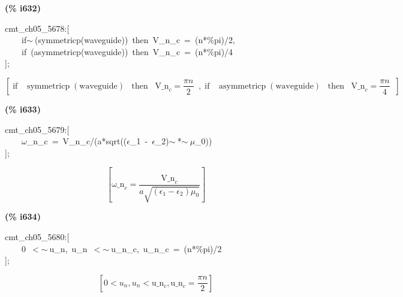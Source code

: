 \documentclass[fleqn]{article}
\begin{document}
\noindent
\begin{minipage}[t]{4.000000em}\color{red}\bfseries
(\% i632)	
\end{minipage}
\begin{minipage}[t]{\textwidth}\color{blue}
cmt\_ch05\_5678:[\\
\ \ \ \ if\ensuremath{\sim\ }(symmetricp(waveguide))\ then\ V\_n\_c\ =\ (n*\%pi)/2,\\
\ \ \ \ if\ (asymmetricp(waveguide))\ then\ V\_n\_c\ =\ (n*\%pi)/4\\
];
\end{minipage}
\[\displaystyle \tag{\% o632} 
\operatorname{[}\operatorname{if}\operatorname{ }\operatorname{symmetricp}\left( \ensuremath{\mathrm{waveguide}}\right) \operatorname{ }\operatorname{then}\operatorname{ }{{\ensuremath{\mathrm{V\_ n}}}_c}=\frac{\ensuremath{\pi}  n}{2}\operatorname{ }\operatorname{,}\operatorname{if}\operatorname{ }\operatorname{asymmetricp}\left( \ensuremath{\mathrm{waveguide}}\right) \operatorname{ }\operatorname{then}\operatorname{ 
}{{\ensuremath{\mathrm{V\_ n}}}_c}=\frac{\ensuremath{\pi}  n}{4}\operatorname{ }\operatorname{]}\mbox{}
\]


\noindent
\begin{minipage}[t]{4.000000em}\color{red}\bfseries
(\% i633)	
\end{minipage}
\begin{minipage}[t]{\textwidth}\color{blue}
cmt\_ch05\_5679:[\\
\ \ \ \ \ensuremath{\omega}\_n\_c\ =\ V\_n\_c/(a*sqrt((\ensuremath{\epsilon}\_1\ -\ \ensuremath{\epsilon}\_2)\ensuremath{\sim\ }*\ensuremath{\sim\ }\ensuremath{\mu}\_0))\ \\
];
\end{minipage}
\[\displaystyle \tag{\% o633} 
\left[ {{\ensuremath{\mathrm{\omega \_ n}}}_c}=\frac{{{\ensuremath{\mathrm{V\_ n}}}_c}}{a \sqrt{\left( {{\epsilon }_1}-{{\epsilon }_2}\right)  {{\mu }_0}}}\right] \mbox{}
\]


\noindent
\begin{minipage}[t]{4.000000em}\color{red}\bfseries
(\% i634)	
\end{minipage}
\begin{minipage}[t]{\textwidth}\color{blue}
cmt\_ch05\_5680:[\\
\ \ \ \ 0\ \ensuremath{<}\ensuremath{\sim\ }u\_n,\ u\_n\ \ensuremath{<}\ensuremath{\sim\ }u\_n\_c,\ u\_n\_c\ =\ (n*\%pi)/2\\
];
\end{minipage}
\[\displaystyle \tag{\% o634} 
\left[ 0\operatorname{<  }{u_n}\operatorname{,}{u_n}\operatorname{<  }{{\ensuremath{\mathrm{u\_ n}}}_c}\operatorname{,}{{\ensuremath{\mathrm{u\_ n}}}_c}=\frac{\ensuremath{\pi}  n}{2}\right] \mbox{}
\]
\end{document}
